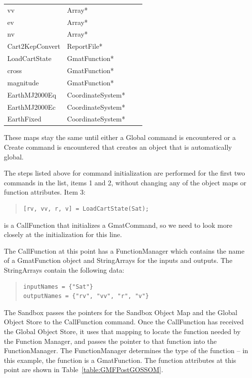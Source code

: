 \begin{center}
\begin{supertabular}{|p{1.4in}p{1.4in}|p{1.4in}p{1.4in}|}
vv & Array* & & \\
ev & Array* & & \\
nv & Array* & & \\
Cart2KepConvert & ReportFile* & & \\
LoadCartState & GmatFunction* & & \\
cross & GmatFunction* & & \\
magnitude & GmatFunction* & & \\
EarthMJ2000Eq & CoordinateSystem* & & \\
EarthMJ2000Ec & CoordinateSystem* & & \\
EarthFixed & CoordinateSystem* & & \\
\end{supertabular}
\end{center}

\noindent These maps stay the same until either a Global command is encountered or a Create command
is encountered that creates an object that is automatically global.

The steps listed above for command initialization are performed for the first two commands in the
list, items 1 and 2, without changing any of the object maps or function attributes.  Item 3:

\begin{quote}
\begin{verbatim}
[rv, vv, r, v] = LoadCartState(Sat);
\end{verbatim}
\end{quote}

\noindent is a CallFunction that initializes a GmatCommand, so we need to look more closely at the
initialization for this line.

The CallFunction at this point has a FunctionManager which contains the name of a GmatFunction
object and StringArrays for the inputs and outputs.  The StringArrays contain the following data:

\begin{quote}
\begin{verbatim}
inputNames = {"Sat"}
outputNames = {"rv", "vv", "r", "v"}
\end{verbatim}
\end{quote}

The Sandbox passes the pointers for the Sandbox Object Map and the Global Object Store to the
CallFunction command.  Once the CallFunction has received the Global Object Store, it uses that
mapping to locate the function needed by the Function Manager, and passes the pointer to that
function into the FunctionManager.  The FunctionManager determines the type of the function -- in
this example, the function is a GmatFunction.  The function attributes at this point are shown in
Table~\ref{table:GMFPostGOSSOM}.

